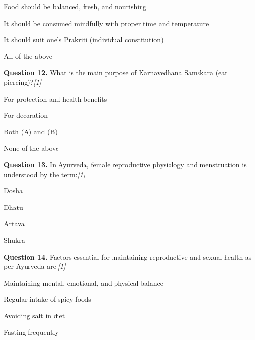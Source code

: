 \documentclass[11pt,a4paper]{article}
\newcommand{\pts}[1]{\hfill   \textit{[#1]}}
\begin{document}
\begin{parts}
  \item Food should be balanced, fresh, and nourishing
  \item It should be consumed mindfully with proper time and temperature
  \item It should suit one's Prakriti (individual constitution)
  \item All of the above
\end{parts}

\medskip




\noindent   \textbf{Question 12.} What is the main purpose of Karnavedhana Samskara (ear piercing)?\pts{1}

\begin{parts}
  \item For protection and health benefits
  \item For decoration
  \item Both (A) and (B)
  \item None of the above
\end{parts}

\medskip




\noindent   \textbf{Question 13.} In Ayurveda, female reproductive physiology and menstruation is understood by the term:\pts{1}

\begin{parts}
  \item Dosha
  \item Dhatu
  \item Artava
  \item Shukra
\end{parts}

\medskip




\noindent   \textbf{Question 14.} Factors essential for maintaining reproductive and sexual health as per Ayurveda are:\pts{1}

\begin{parts}
  \item Maintaining mental, emotional, and physical balance
  \item Regular intake of spicy foods
  \item Avoiding salt in diet
  \item Fasting frequently
\end{parts}

\medskip
\end{document}
